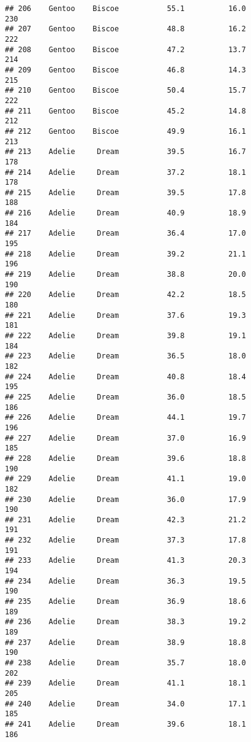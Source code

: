 \documentclass[
]{article}
\begin{document}
\begin{verbatim}
## 206    Gentoo    Biscoe           55.1          16.0               230
## 207    Gentoo    Biscoe           48.8          16.2               222
## 208    Gentoo    Biscoe           47.2          13.7               214
## 209    Gentoo    Biscoe           46.8          14.3               215
## 210    Gentoo    Biscoe           50.4          15.7               222
## 211    Gentoo    Biscoe           45.2          14.8               212
## 212    Gentoo    Biscoe           49.9          16.1               213
## 213    Adelie     Dream           39.5          16.7               178
## 214    Adelie     Dream           37.2          18.1               178
## 215    Adelie     Dream           39.5          17.8               188
## 216    Adelie     Dream           40.9          18.9               184
## 217    Adelie     Dream           36.4          17.0               195
## 218    Adelie     Dream           39.2          21.1               196
## 219    Adelie     Dream           38.8          20.0               190
## 220    Adelie     Dream           42.2          18.5               180
## 221    Adelie     Dream           37.6          19.3               181
## 222    Adelie     Dream           39.8          19.1               184
## 223    Adelie     Dream           36.5          18.0               182
## 224    Adelie     Dream           40.8          18.4               195
## 225    Adelie     Dream           36.0          18.5               186
## 226    Adelie     Dream           44.1          19.7               196
## 227    Adelie     Dream           37.0          16.9               185
## 228    Adelie     Dream           39.6          18.8               190
## 229    Adelie     Dream           41.1          19.0               182
## 230    Adelie     Dream           36.0          17.9               190
## 231    Adelie     Dream           42.3          21.2               191
## 232    Adelie     Dream           37.3          17.8               191
## 233    Adelie     Dream           41.3          20.3               194
## 234    Adelie     Dream           36.3          19.5               190
## 235    Adelie     Dream           36.9          18.6               189
## 236    Adelie     Dream           38.3          19.2               189
## 237    Adelie     Dream           38.9          18.8               190
## 238    Adelie     Dream           35.7          18.0               202
## 239    Adelie     Dream           41.1          18.1               205
## 240    Adelie     Dream           34.0          17.1               185
## 241    Adelie     Dream           39.6          18.1               186

\end{verbatim}
\end{document}
